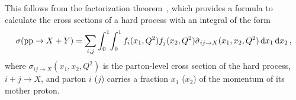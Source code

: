 

This follows from the factorization theorem~\cite{PDF_factorization1,PDF_factorization2}, which provides a formula to calculate the cross sections of a hard process with an integral of the form
\begin{equation}
  \sigma(\mathrm{p}\mathrm{p}\to X + Y)
  = \sum_{i,j} \int_0^1\!\int_0^1 f_i(x_1,Q^2) f_j(x_2,Q^2) \hat\sigma_{ij\to X}(x_1,x_2,Q^2)\dd{x_1}\dd{x_2},
\end{equation}
where $\sigma_{ij\to X}(x_1,x_2,Q^2)$ is the parton-level cross section of the hard process, $i+j \to X$,
and parton $i$ ($j$) carries a fraction $x_1$ ($x_2$) of the momentum of its mother proton.

